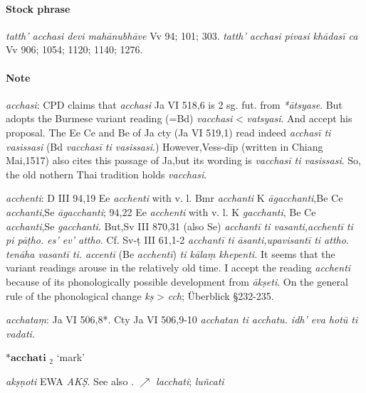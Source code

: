 \documentclass[11pt]{article}
\newcommand*\ṛ{r\symbol{"325}}
\newcommand*\Ṛ{R\symbol{"325}}
\newcommand*\ṝ{r\symbol{"304}\symbol{"325}}
\newcommand*\Ṝ{R\symbol{"304}\symbol{"325}}
\newcommand*\ḷ{l\symbol{"325}}
\newcommand*\ḹ{l\symbol{"304}\symbol{"325}}
\newcommand*\Ḷ{L\symbol{"325}}
\newcommand*\Ḹ{L\symbol{"304}\symbol{"325}}
\begin{document}
\paragraph*{Stock phrase}
\textit{tatth' acchasi devi mahānubhāve} Vv 94; 101; 303.
\textit{tatth' acchasi pivasi khādasī ca} Vv 906; 1054; 1120; 1140; 1276.

\paragraph*{Note}
\textit{acchasi}: CPD claims that \textit{acchasi} Ja VI 518,6 is 2 sg. fut. from \textit{*ātsyase}.
But \citet[39]{alsdorf:57} adopts the Burmese variant reading (=Bd) \textit{vacchasi} < \textit{vatsyasi}.
And \citet[99]{cone:77} accept his proposal.
The Ee Ce and Be of Ja cty (Ja VI 519,1) read indeed \textit{acchasī ti vasissasi} (Bd \textit{vacchasī ti vasissasi}.)
However,Vess-dīp (written in Chiang Mai,1517) also cites this passage of Ja,but its wording is \textit{vacchasī ti vasissasi}.
So, the old nothern Thai tradition holds \textit{vacchasi}.

\textit{acchenti}: D III 94,19 Ee \textit{acchenti} with v. l. Bmr \textit{acchanti} K \textit{āgacchanti},Be Ce \textit{acchanti},Se \textit{āgacchanti};
94,22 Ee \textit{acchenti} with v. l. K \textit{gacchanti}, Be Ce \textit{acchanti},Se \textit{gacchanti}.
But,Sv III 870,31 (also Se) \textit{acchantī ti vasanti,acchentī ti pi pāṭho. es' ev' attho}.
Cf. Sv-ṭ III 61,1-2 \textit{acchantī ti āsanti,upavisantī ti attho. tenāha vasantī ti. accentī} (Be \textit{acchentī}) \textit{ti kālaṃ khepenti.}
It seems that the variant readings arouse in the relatively old time.
I accept the reading \textit{acchenti} because of its phonologically possible development from \textit{ākṣeti}.
On the general rule of the phonological change \textit{kṣ} > \textit{cch}; Überblick §232-235.

\textit{acchataṃ}: Ja VI 506,8*. Cty Ja VI 506,9-10 \textit{acchatan ti acchatu. idh' eva hotū ti vadati.}

%
%
\begin{center}
{\Large
$\textbf{*acchati }_2$ `mark'
}
\end{center}
\begin{description}[leftmargin=\parindent]
\item[Skt.]
\textit{akṣṇoti}
EWA \textit{AKṢ}.
See also \citet[85]{narten:1964}.
$\nearrow$ \textit{lacchati}; \textit{luñcati}
\end{description}
\end{document}
